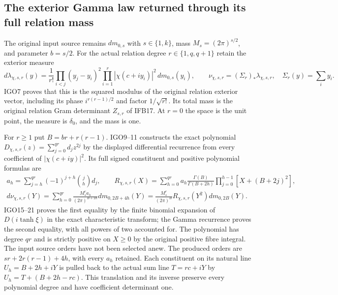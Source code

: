 \documentclass[11pt,a4paper]{article}
\begin{document}
\subsection{The exterior Gamma law returned through its full relation mass}

The original input source remains $dm_{0,s}$ with $s\in\{1,k\}$,
mass $M_s=(2\pi)^{s/2}$, and parameter $b=s/2$. For the actual
relation degree $r\in\{1,q,q+1\}$ retain the exterior measure
\[
 d\lambda_{\chi,s,r}(y)=\frac1{r!}
       \prod_{i<j}(y_j-y_i)^2
       \prod_{i=1}^r|\chi(c+iy_i)|^2\,dm_{0,s}(y_i),
 \qquad \nu_{\chi,s,r}=(\Sigma_r)_*\lambda_{\chi,s,r},
 \quad \Sigma_r(y)=\sum_i y_i.
 \tag{IRI1}
\]
IGO7 proves that this is the squared modulus of the original
relation exterior vector, including its phase
$i^{r(r-1)/2}$ and factor $1/\sqrt{r!}$. Its total mass is the
original relation Gram determinant $Z_{s,r}$ of IFB17. At $r=0$
the space is the unit point, the measure is $\delta_0$, and the
mass is one.

For $r\ge1$ put $B=br+r(r-1)$. IGO9--11 constructs the exact
polynomial $D_{\chi,s,r}(z)=\sum_{j=0}^{qr}d_jz^{2j}$ by the
displayed differential recurrence from every coefficient of
$|\chi(c+iy)|^2$. Its full signed constituent and positive
polynomial formulas are
\[
\begin{gathered}
 a_h=\sum_{j=h}^{qr}(-1)^{j+h}\binom jh d_j,\qquad
 R_{\chi,s,r}(X)=\sum_{h=0}^{qr}a_h
       \frac{\Gamma(B)}{\Gamma(B+2h)}
       \prod_{j=0}^{h-1}[X+(B+2j)^2],\\
 d\nu_{\chi,s,r}(Y)
 =\sum_{h=0}^{qr}\frac{M_s^ra_h}{(2\pi)^{B+2h}}
                             dm_{0,2B+4h}(Y)
 =\frac{M_s^r}{(2\pi)^B}
                  R_{\chi,s,r}(Y^2)dm_{0,2B}(Y).
\end{gathered}\tag{IRI2}
\]
IGO15--21 proves the first equality by the finite binomial expansion
of $D(i\tanh\xi)$ in the exact characteristic transform; the Gamma
recurrence proves the second equality, with all powers of two
accounted for. The polynomial has degree $qr$ and is strictly
positive on $X\ge0$ by the original positive fibre integral.
The input source orders have not been selected anew. The produced
orders are $sr+2r(r-1)+4h$, with every $a_h$ retained. Each
constituent on its natural line $U_h=B+2h+iY$ is pulled back to
the actual sum line $T=rc+iY$ by
$U_h=T+(B+2h-rc)$. This translation and its inverse preserve every
polynomial degree and have coefficient determinant one.
\end{document}
